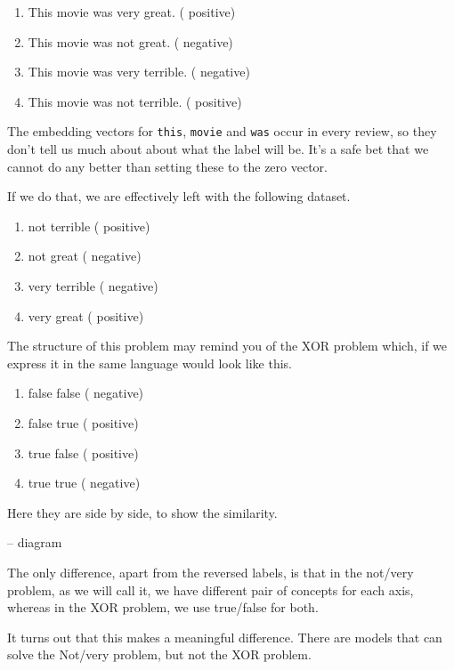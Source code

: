 \documentclass{pca}
\newcommand{\rc}[1]{{\color{my-red} #1}}
\newcommand{\bc}[1]{{\color{my-blue} #1}}
\theoremstyle{theorem}
\theoremstyle{definition}
\theoremstyle{proof}
\begin{document}
\begin{enumerate}
\item This movie was very great. (\bc{positive})
\item This movie was not great. (\rc{negative})
\item This movie was very terrible. (\rc{negative})
\item This movie was not terrible. (\bc{positive})
\end{enumerate}

The embedding vectors for \texttt{this}, \texttt{movie} and \texttt{was} occur in every review, so they don't tell us much about about what the label will be. It's a safe bet that we cannot do any better than setting these to the zero vector.

\pagebreak[4]

If we do that, we are effectively left with the following dataset.

\begin{enumerate}
\item not terrible (\bc{positive})
\item not great (\rc{negative})
\item very terrible (\rc{negative})
\item very great (\bc{positive})
\end{enumerate}

The structure of this problem may remind you of the XOR problem which, if we express it in the same language would look like this.

\begin{enumerate}
\item false false (\rc{negative})
\item false true (\bc{positive})
\item true false (\bc{positive})
\item true true (\rc{negative})
\end{enumerate}


Here they are side by side, to show the similarity.

-- diagram

The only difference, apart from the reversed labels, is that in the not/very problem, as we will call it, we have different pair of concepts for each axis, whereas in the XOR problem, we use true/false for both.

It turns out that this makes a meaningful difference. There are models that can solve the Not/very problem, but not the XOR problem. 
\end{document}
